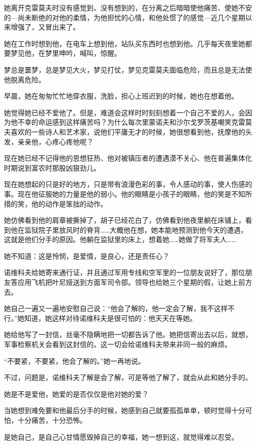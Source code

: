 她离开克雷莫夫时没有感觉到、没有想到的，在分离之后暗暗使他痛苦、使她不安的—尚未断绝的对他的柔情，为他担忧的心情，和他处惯了的感觉—近几个星期以来增强了，又冒出来了。

她在工作时想到他，在电车上想到他，站队买东西时也想到他。几乎每天夜里她都要梦见他，在梦里呻吟，喊叫，惊醒。

梦总是噩梦，总是梦见大火，梦见打仗，梦见克雷莫夫面临危险，而且总是无法使他脱离危险。

早晨，她在匆匆忙忙地穿衣服，洗脸，担心上班迟到的时候，她也在想着他。

她觉得她已经不爱他了。但是，难道会这样时时刻刻想着一个自己不爱的人，会因为他不幸的命运感到这样痛苦吗？为什么每次里蒙诺夫和沙尔戈罗茨基嘲笑克雷莫夫喜欢的一些诗人和艺术家，说他们平庸无才的时候，她很想看到他，抚摩他的头发，亲亲他，心疼心疼他呢？

现在她已经不记得他的思想狂热、他对被镇压者的遭遇漠不关心、他在普遍集体化时期说到富农时那股凶狠劲儿。

现在她想起的只是好的地方，只是带有浪漫色彩的事，令人感动的事，使人伤感的事。现在他征服她的力量是他的弱小。他的眼睛是小孩子的眼睛，他的笑是不知所措的笑，他的动作是笨拙的动作。

她仿佛看到他的肩章被撕掉了，胡子已经花白了，仿佛看到他夜里躺在床铺上，看到他在监狱院子里放风时的脊背……大概他在想，她本能地预测到他今天的遭遇，这就是他们分手的原因。他躺在监狱里的床上，想着她……她做了将军夫人……

她不知道：这是怜悯，是爱情，是良心，还是责任心？

诺维科夫给她寄来通行证，并且通过军用专线和空军里的一位朋友说好了，那位朋友答应用飞机把叶尼娅送到方面军司令部。领导也给她三个星期的假，让她上前方去。

她自己一遍又一遍地安慰自己说：“他会了解的，他一定会了解，我不这样不行。”她知道，她这样对待诺维科夫是很可怕的：他天天在等她。

她给他写了一封信，丝毫不隐瞒地把一切都告诉了他。她把信寄出去以后，就想，军事检察机关会看到这封信的。这一切会给诺维科夫带来非同一般的麻烦。

“不要紧，不要紧，他会了解的。”她一再地说。

不过，问题是，诺维科夫了解是会了解，可是等他了解了，就会从此和她分手的。

她是不是爱他，她爱的是否仅仅是他对她的爱？

当她想到难免要和他最后分手的时候，她感到自己就要孤孤单单，顿时觉得十分可怕，十分痛苦，十分恐怖。

是她自己，是自己心甘情愿毁掉自己的幸福，她一想到这，就觉得难以忍受。

